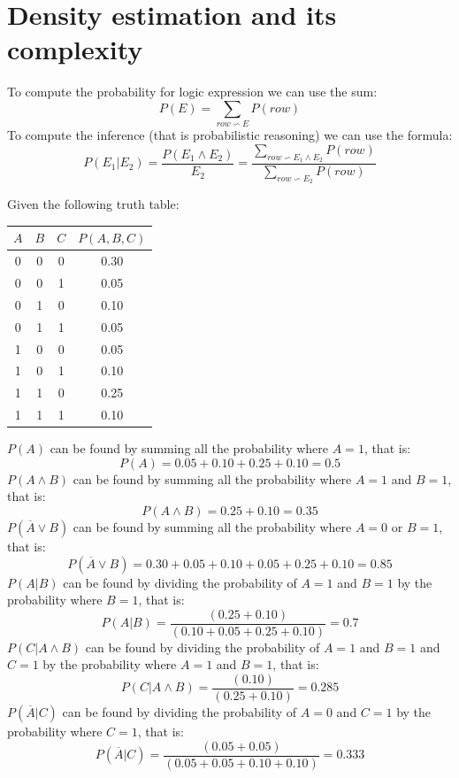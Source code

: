 \documentclass[12pt, a4paper]{report}
\newtheorem[style=M,bodystyle=\normalfont]{theorem}{Theorem}
\newtheorem[style=M,bodystyle=\normalfont]{corollary}{Corollary}
\newtheorem[style=M,bodystyle=\normalfont]{lemma}{Lemma}
\newtheorem[style=M,bodystyle=\normalfont]{definition}{Definition}
\begin{document}
    \section{Density estimation and its complexity}
    To compute the probability for logic expression we can use the sum: 
    \[P(E)=\sum_{row \backsim E}P(row)\]
    To compute the inference (that is probabilistic reasoning) we can use the formula: 
    \[P(E_1|E_2)=\dfrac{P(E_1 \land E_2)}{E_2}=\dfrac{\sum_{row \backsim E_1 \land E_2}P(row)}{\sum_{row \backsim E_2}P(row)}\]
    \begin{example}
        Given the following truth table: 
        \begin{table}[H]
            \centering
            \begin{tabular}{|c|c|c|c|}
            \hline
            $A$ & $B$ & $C$ & $P(A,B,C)$ \\ \hline
            0   & 0   & 0   & 0.30       \\ \hline
            0   & 0   & 1   & 0.05       \\ \hline
            0   & 1   & 0   & 0.10       \\ \hline
            0   & 1   & 1   & 0.05       \\ \hline
            1   & 0   & 0   & 0.05       \\ \hline
            1   & 0   & 1   & 0.10       \\ \hline
            1   & 1   & 0   & 0.25       \\ \hline
            1   & 1   & 1   & 0.10       \\ \hline
            \end{tabular}
        \end{table}
        $P(A)$ can be found by summing all the probability where $A=1$, that is: 
        \[P(A) = 0.05 + 0.10 + 0.25 + 0.10 = 0.5\]
        $P(A \land B)$ can be found by summing all the probability where $A=1$ and $B=1$, that is: 
        \[P(A \land B) = 0.25 + 0.10 = 0.35\]
        $P(\overline{A} \lor B)$ can be found by summing all the probability where $A=0$ or $B=1$, that is: 
        \[P(\overline{A} \lor B) = 0.30 + 0.05 + 0.10 + 0.05 + 0.25 + 0.10 = 0.85\]
        $P(A | B)$ can be found by dividing the probability of $A=1$ and $B=1$ by the probability where $B=1$, that is: 
        \[P(A | B) = \dfrac{(0.25+0.10)}{(0.10+0.05+0.25+0.10)}=0.7\]
        $P(C | A \land B)$ can be found by dividing the probability of $A=1$ and $B=1$ and $C=1$ by the probability where $A=1$ and $B=1$, that is: 
        \[P(C | A \land B) = \dfrac{(0.10)}{(0.25+0.10)}=0.285\]
        $P(\overline{A} | C)$ can be found by dividing the probability of $A=0$ and $C=1$ by the probability where $C=1$, that is: 
        \[P(\overline{A} | C) = \dfrac{(0.05+0.05)}{(0.05+0.05+0.10+0.10)}=0.333\]
    \end{example}
\end{document}
